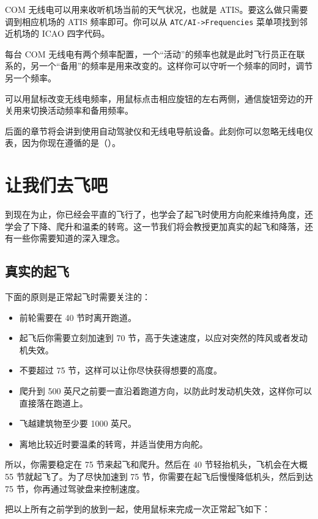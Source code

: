 \begin{itemize}
COM 无线电可以用来收听机场当前的天气状况，也就是 ATIS。要这么做只需要调到相应机场的 ATIS 频率即可。你可以从 \texttt{ATC/AI->Frequencies} 菜单项找到邻近机场的 ICAO 四字代码。

每台 COM 无线电有两个频率配置，一个“活动”的频率也就是此时飞行员正在联系的，另一个“备用”的频率是用来改变的。这样你可以守听一个频率的同时，调节另一个频率。

可以用鼠标改变无线电频率，用鼠标点击相应旋钮的左右两侧，通信旋钮旁边的开关用来切换活动频率和备用频率。

后面的章节将会讲到使用自动驾驶仪和无线电导航设备。此刻你可以忽略无线电仪表，因为你现在遵循的是（）。

\section{让我们去飞吧}

到现在为止，你已经会平直的飞行了，也学会了起飞时使用方向舵来维持角度，还学会了下降、爬升和温柔的转弯。这一节我们将会教授更加真实的起飞和降落，还有一些你需要知道的深入理念。

\subsection{真实的起飞}
\label{sec:Start}

下面的原则是正常起飞时需要关注的：

\begin{itemize}
    \item 前轮需要在 40 节时离开跑道。
    \item 起飞后你需要立刻加速到 70 节，高于失速速度，以应对突然的阵风或者发动机失效。
    \item 不要超过 75 节，这样可以让你尽快获得想要的高度。
    \item 爬升到 500 英尺之前要一直沿着跑道方向，以防此时发动机失效，这样你可以直接落在跑道上。
    \item 飞越建筑物至少要 1000 英尺。
    \item 离地比较近时要温柔的转弯，并适当使用方向舵。
\end{itemize}

所以，你需要稳定在 75 节来起飞和爬升。然后在 40 节轻抬机头，飞机会在大概 55 节就起飞了。为了尽快加速到 75 节，你需要在起飞后慢慢降低机头，然后到达 75 节，你再通过驾驶盘来控制速度。

把以上所有之前学到的放到一起，使用鼠标来完成一次正常起飞如下：


\end{itemize}
